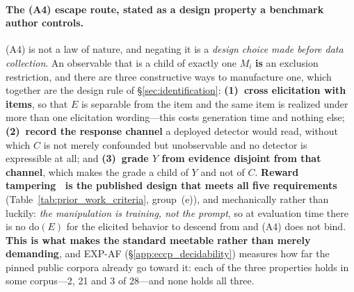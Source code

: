 \paragraph{The (A4) escape route, stated as a design property a benchmark author controls.} (A4) is not a law of nature, and negating it is a \emph{design choice made before data collection}. An observable that is a child of exactly one $M_i$ \textbf{is} an exclusion restriction, and there are three constructive ways to manufacture one, which together are the design rule of §\ref{sec:identification}: \textbf{(1)~cross elicitation with items}, so that $E$ is separable from the item and the same item is realized under more than one elicitation wording---this costs generation time and nothing else; \textbf{(2)~record the response channel} a deployed detector would read, without which $C$ is not merely confounded but unobservable and no detector is expressible at all; and \textbf{(3)~grade $Y$ from evidence disjoint from that channel}, which makes the grade a child of $Y$ and not of $C$. \textbf{Reward tampering~\citep{denison2024sycophancy} is the published design that meets all five requirements} (Table~\ref{tab:prior_work_criteria}, group~(e)), and mechanically rather than luckily: \emph{the manipulation is training, not the prompt}, so at evaluation time there is no $\mathrm{do}(E)$ for the elicited behavior to descend from and (A4) does not bind. \textbf{This is what makes the standard meetable rather than merely demanding}, and EXP-AF (§\ref{app:eccp_decidability}) measures how far the pinned public corpora already go toward it: each of the three properties holds in some corpus---2, 21 and 3 of 28---and none holds all three.

